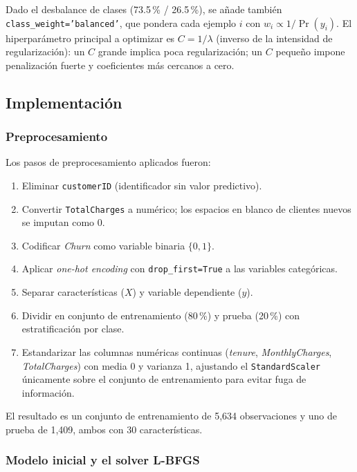 \documentclass[spanish]{article}
\begin{document}
Dado el desbalance de clases (73.5\,\% / 26.5\,\%), se añade también \texttt{class\_weight='balanced'}, que pondera cada ejemplo $i$ con $w_i \propto 1/\Pr(y_i)$. El hiperparámetro principal a optimizar es $C = 1/\lambda$ (inverso de la intensidad de regularización): un $C$ grande implica poca regularización; un $C$ pequeño impone penalización fuerte y coeficientes más cercanos a cero.

\subsection{Implementación}

\subsubsection{Preprocesamiento}

Los pasos de preprocesamiento aplicados fueron:

\begin{enumerate}
    \item Eliminar \texttt{customerID} (identificador sin valor predictivo).
    \item Convertir \texttt{TotalCharges} a numérico; los espacios en blanco de clientes nuevos se imputan como 0.
    \item Codificar \textit{Churn} como variable binaria $\{0, 1\}$.
    \item Aplicar \textit{one-hot encoding} con \texttt{drop\_first=True} a las variables categóricas.
    \item Separar características ($X$) y variable dependiente ($y$).
    \item Dividir en conjunto de entrenamiento (80\,\%) y prueba (20\,\%) con estratificación por clase.
    \item Estandarizar las columnas numéricas continuas (\textit{tenure}, \textit{MonthlyCharges}, \textit{TotalCharges}) con media 0 y varianza 1, ajustando el \texttt{StandardScaler} únicamente sobre el conjunto de entrenamiento para evitar fuga de información.
\end{enumerate}

El resultado es un conjunto de entrenamiento de 5{,}634 observaciones y uno de prueba de 1{,}409, ambos con 30 características.

\subsubsection{Modelo inicial y el solver L-BFGS}
\end{document}
